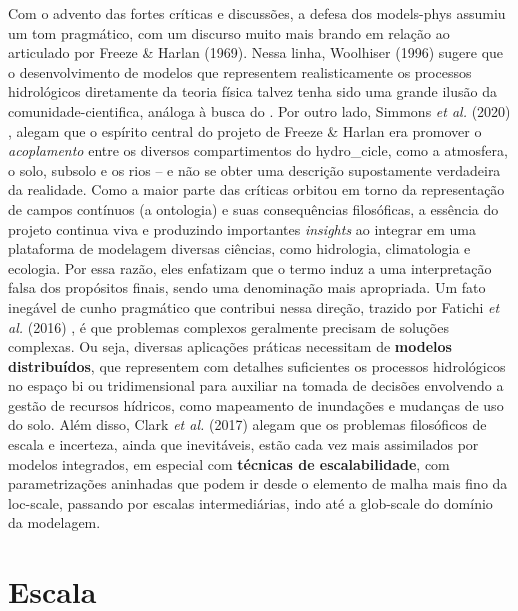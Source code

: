 \documentclass[./main.tex]{subfiles}
\begin{document}
\par Com o advento das fortes críticas e discussões, a defesa dos \gls{models-phys} assumiu um tom pragmático, com um discurso muito mais brando em relação ao articulado por Freeze \& Harlan (1969). Nessa linha, Woolhiser (1996) \cite{Woolhiser1996a} sugere que o desenvolvimento de modelos que representem realisticamente os processos hidrológicos diretamente da \gls{teoria} física talvez tenha sido uma grande ilusão da \gls{comunidade-cientifica}, análoga à busca do . Por outro lado, Simmons \textit{et al.} (2020) \cite{Simmons2020a}, alegam que o espírito central do projeto de Freeze \& Harlan era promover o \textit{acoplamento} entre os diversos compartimentos do \gls{hydro_cicle}, como a atmosfera, o solo, subsolo e os rios -- e não se obter uma descrição supostamente verdadeira da realidade. Como a maior parte das críticas orbitou em torno da representação de campos contínuos (a ontologia) e suas consequências filosóficas, a essência do projeto continua viva e produzindo importantes \textit{insights} ao integrar em uma plataforma de modelagem diversas ciências, como hidrologia, climatologia e ecologia. Por essa razão, eles enfatizam que o termo  induz a uma interpretação falsa dos propósitos finais, sendo  uma denominação mais apropriada. Um fato inegável de cunho pragmático que contribui nessa direção, trazido por Fatichi \textit{et al.} (2016) \cite{Fatichi2016a}, é que problemas complexos geralmente precisam de soluções complexas. Ou seja, diversas aplicações práticas necessitam de \textbf{modelos distribuídos}, que representem com detalhes suficientes os processos hidrológicos no espaço bi ou tridimensional para auxiliar na tomada de decisões envolvendo a gestão de recursos hídricos, como mapeamento de inundações e mudanças de uso do solo. Além disso, Clark \textit{et al.} (2017) \cite{Clark2017a} alegam que os problemas filosóficos de escala e incerteza, ainda que inevitáveis, estão cada vez mais assimilados por modelos integrados, em especial com \textbf{técnicas de escalabilidade}, com parametrizações aninhadas que podem ir desde o elemento de malha mais fino da \gls{loc-scale}, passando por escalas intermediárias, indo até a \gls{glob-scale} do domínio da modelagem.
 
\section{Escala} \label{sec:hydro:sim}
\end{document}
